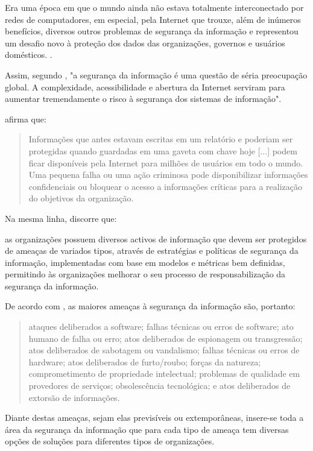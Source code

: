 Era uma época em que o mundo ainda não estava totalmente interconectado por redes de computadores, em especial, pela Internet que trouxe, além de inúmeros benefícios, diversos outros problemas de segurança da informação e representou um desafio novo à proteção dos dados das organizações, governos e usuários domésticos. \cite{fontes_politicas}. 

Assim, segundo \cite{mukkamala_intrusion_2002}, "a segurança da informação é uma questão de séria preocupação global. A complexidade, acessibilidade e abertura da Internet serviram para aumentar tremendamente o risco à segurança dos sistemas de informação".

\cite[p. 2]{fontes_politicas} afirma que:
\begin{quote}
	Informações que antes estavam escritas em um relatório e poderiam ser protegidas quando guardadas em uma gaveta com chave hoje [...] podem ficar disponíveis pela Internet para milhões de usuários em todo o mundo. Uma pequena falha ou uma ação criminosa pode disponibilizar informações confidenciais ou bloquear o acesso a informações críticas para a realização do objetivos da organização.
\end{quote}

Na mesma linha, \cite{casaca_porque_2013} discorre que:

\begin{citacao}
	as organizações possuem diversos activos de informação que devem ser 
protegidos de ameaças de variados tipos, através de estratégias e políticas de 
segurança  da  informação,  implementadas  com  base  em  modelos  e  métricas 
bem  definidas,  permitindo  às  organizações  melhorar  o  seu  processo  de 
responsabilização da segurança da informação.
\end{citacao}

De acordo com \cite{benz_universidade_nodate}, as maiores ameaças à segurança da informação são, portanto:
\begin{quote}
	ataques deliberados a software; falhas técnicas ou erros de software; ato humano de falha ou erro; atos deliberados de espionagem ou transgressão; atos deliberados de sabotagem ou vandalismo; falhas técnicas ou erros de hardware; atos deliberados de furto/roubo; forças da natureza; comprometimento de propriedade intelectual; problemas de qualidade em provedores de serviços; obsolescência tecnológica; e atos deliberados de extorsão de informações.
\end{quote}

Diante destas ameaças, sejam elas previsíveis ou extemporâneas, insere-se toda a área da segurança da informação que para cada tipo de ameaça tem diversas opções de soluções para diferentes tipos de organizações. \cite{doherty_information_2005} 

